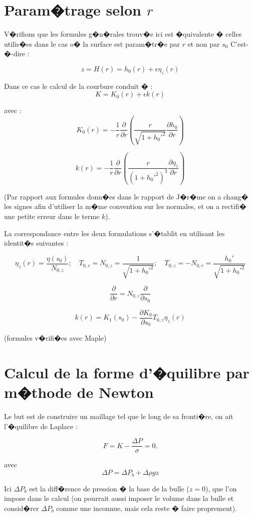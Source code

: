 \documentclass{jfm}
\newcommand\DP[2]{\frac{\partial #1}{\partial #2}}
\begin{document}
\section{Param�trage selon $r$}

V�rifions que les formules g�n�rales trouv�e ici est �quivalente � celles utilis�es dans le cas o� la surface est param�tr�e par $r$ et non par $s_0$ C'est-�-dire : 

$$
z = H(r) = h_0(r) + \epsilon \eta_z (r)
$$

Dans ce cas le calcul de la courbure conduit � :
$$
K =  K_0(r) + \epsilon k(r)
$$

avec :
$$
K_0(r) = -\frac{1}{r} \DP{}{r} \left( \frac{r}{\sqrt{1+ h_0'^2}} \DP{h_0}{r} \right)
$$

$$
k(r) = -\frac{1}{r} \DP{}{r} \left( \frac{r}{\left(1+ h_0'^2\right)^3} \DP{\eta_z}{r} \right) 
$$

(Par rapport aux formules donn�es dans le rapport de J�r�me on a chang� les signes afin d'utiliser la m�me convention sur les normales, et on a rectifi� une petite erreur dans le terme $k$).


La correspondance entre les deux formulations s'�tablit en utilisant les identit�s suivantes :

$$ 
\eta_z(r) = \frac{\eta(s_0)}{N_{0,z}}  ; 
\quad 
T_{0,r} = N_{0,z} = \frac{1}{\sqrt{1+ h_0'^2}}; 
\quad 
T_{0,z} = -N_{0,r} =  \frac{h_0'}{\sqrt{1+ h_0'^2}}
$$

$$
\DP{}{r} = N_{0,z} \DP{}{s_0}
$$

$$
k(r) = K_1(s_0)  - \DP{K_0}{s_0} T_{0,z} \eta_z(r)
$$

(formules v�rifi�es avec Maple)

\section{Calcul de la forme d'�quilibre par m�thode de Newton}

Le but est de construire un maillage tel que le long de sa fronti�re, on ait l'�quilibre de Laplace :

\begin{equation}
F = K - \frac{\Delta P}{\sigma} = 0.
\end{equation}

avec 
$$
\Delta P = \Delta P_b + \Delta \rho g z
$$




Ici $\Delta P_b$ est la diff�rence de pression � la base de la bulle ($z=0$), que l'on impose dans le calcul
(on pourrait aussi imposer le volume dans la bulle et consid�rer $\Delta P_b$ comme une inconnue, mais cela reste � faire proprement).
\end{document}

